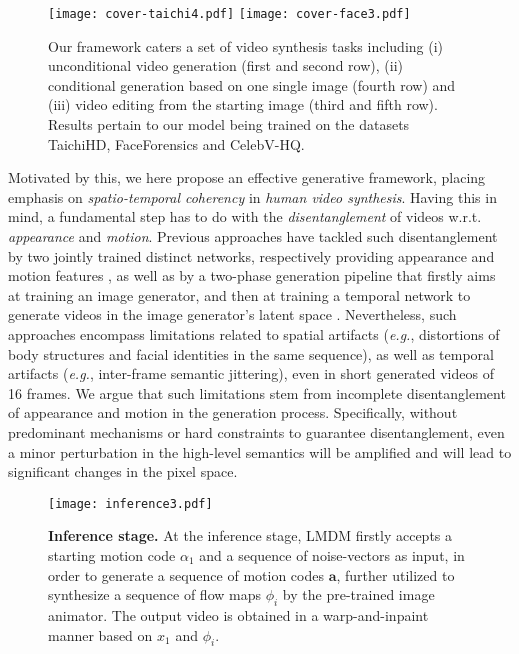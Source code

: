 \begin{figure*}[!ht]
\centering
\texttt{[image: cover-taichi4.pdf]}
\texttt{[image: cover-face3.pdf]}
\caption{Our framework caters a set of video synthesis tasks including (i) unconditional video generation (first and second row), (ii) conditional generation based on one single image (fourth row) and (iii) video editing from the starting image (third and fifth row). Results pertain to our model being trained on the datasets TaichiHD, FaceForensics and CelebV-HQ.}
\label{fig:cover}
\end{figure*}

Motivated by this, we here propose an effective generative framework, placing emphasis on \textit{spatio-temporal coherency} in \textit{human video synthesis}. Having this in mind, a fundamental step has to do with the \textit{disentanglement} of videos w.r.t. \textit{appearance} and \textit{motion}.
Previous approaches have tackled such disentanglement by two jointly trained distinct networks, respectively providing appearance and motion features \cite{tulyakov2017mocogan,wang2020g3an,wang2021inmodegan,WANG_2020_WACV,digan},
as well as by a two-phase generation pipeline that firstly aims at training an image generator, and then at training a temporal network to generate videos in the image generator's latent space \cite{mocoganhd,tats,videogpt}.
Nevertheless, such approaches encompass limitations related to spatial artifacts (\textit{e.g.}, distortions of body structures and facial identities in the same sequence), as well as temporal artifacts (\textit{e.g.}, inter-frame semantic jittering), even in short generated videos of 16 frames. 
We argue that such limitations stem from incomplete disentanglement of appearance and motion in the generation process.
Specifically, without predominant mechanisms or hard constraints to guarantee disentanglement, even a minor perturbation in the high-level semantics will be amplified and will lead to significant changes in the pixel space.

\begin{figure}[t!]
\centering
\texttt{[image: inference3.pdf]}
\caption{\textbf{Inference stage.} At the inference stage, LMDM firstly accepts a starting motion code $\alpha_1$ and a sequence of noise-vectors as input, in order to generate a sequence of motion codes $\mathbf{a}$, further utilized to synthesize a sequence of flow maps $\phi_i$ by the pre-trained image animator. The output video is obtained in a warp-and-inpaint manner based on $x_1$ and $\phi_i$.}
\label{fig:inference}
\end{figure}

